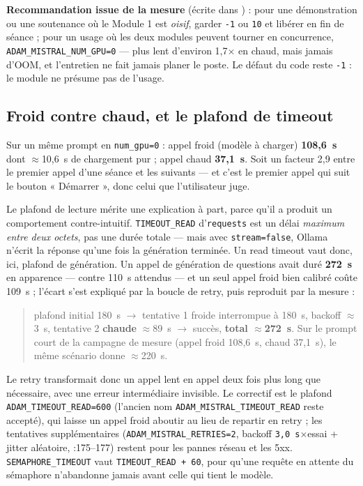 \textbf{Recommandation issue de la mesure} (écrite dans ) :
pour une démonstration ou une soutenance où le Module 1 est \emph{oisif},
garder \texttt{-1} ou \texttt{10} et libérer en fin de séance ; pour un usage où
les deux modules peuvent tourner en concurrence, \texttt{ADAM\_MISTRAL\_NUM\_GPU=0}
--- plus lent d'environ 1,7$\times$ en chaud, mais jamais d'OOM, et l'entretien
ne fait jamais planer le poste. Le défaut du code reste \texttt{-1} : le module
ne présume pas de l'usage.

\subsection{Froid contre chaud, et le plafond de timeout}
\label{sec:perf-timeout}

Sur un même prompt en \texttt{num\_gpu=0} : appel froid (modèle à charger)
\textbf{108,6~s} dont $\approx$10,6~s de chargement pur ; appel chaud
\textbf{37,1~s}. Soit un facteur 2,9 entre le premier appel d'une séance et les
suivants --- et c'est le premier appel qui suit le bouton « Démarrer », donc
celui que l'utilisateur juge.

Le plafond de lecture mérite une explication à part, parce qu'il a produit un
comportement contre-intuitif. \texttt{TIMEOUT\_READ} d'\texttt{requests} est un
délai \emph{maximum entre deux octets}, pas une durée totale --- mais avec
\texttt{stream=false}, Ollama n'écrit la réponse qu'une fois la génération
terminée. Un read timeout vaut donc, ici, plafond de génération. Un appel de
génération de questions avait duré \textbf{272~s} en apparence --- contre 110~s
attendus --- et un seul appel froid bien calibré coûte 109~s ; l'écart s'est
expliqué par la boucle de retry, puis reproduit par la mesure :

\begin{quote}\small
plafond initial 180~s $\to$ tentative 1 froide interrompue à 180~s, backoff
$\approx$3~s, tentative 2 \textbf{chaude} $\approx$89~s $\to$ succès,
\textbf{total $\approx$272~s}. Sur le prompt court de la campagne de mesure
(appel froid 108,6~s, chaud 37,1~s), le même scénario donne $\approx$220~s.
\end{quote}

Le retry transformait donc un appel lent en appel deux fois plus long que
nécessaire, avec une erreur intermédiaire invisible. Le correctif est le plafond
\texttt{ADAM\_TIMEOUT\_READ=600} (l'ancien nom \texttt{ADAM\_MISTRAL\_TIMEOUT\_READ}
reste accepté), qui laisse un appel froid aboutir au lieu de repartir en
retry ; les tentatives supplémentaires (\texttt{ADAM\_MISTRAL\_RETRIES=2},
backoff \texttt{3,0~s}$\times$essai + jitter aléatoire, :175--177)
restent pour les pannes réseau et les 5xx. \texttt{SEMAPHORE\_TIMEOUT} vaut
\texttt{TIMEOUT\_READ + 60}, pour qu'une requête en attente du sémaphore n'abandonne
jamais avant celle qui tient le modèle.

